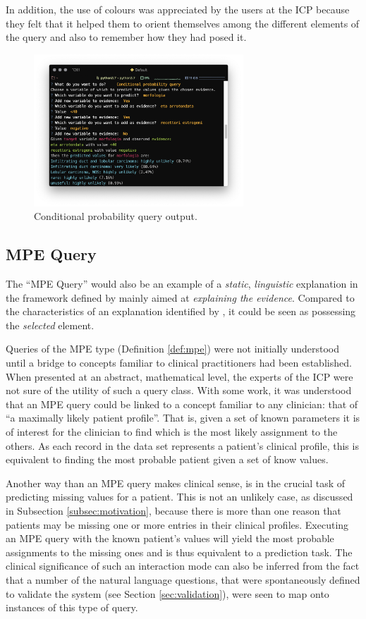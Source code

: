 In addition, the use of colours was appreciated by the users at the ICP because they felt that it helped them to orient themselves among the different elements of the query and also to remember how they had posed it.  

\begin{figure}[htbp]
\centerline{\includegraphics[width=0.7\textwidth]{results/images/sw_3_query}}
\caption{Conditional probability query output.}
\label{fig:sw_3_query}
\end{figure}

\subsection{MPE Query}
The \enquote{MPE Query} would also be an example of a \textit{static}, \textit{linguistic} explanation in the framework defined by \citet{lacave2002review} mainly aimed at \textit{explaining the evidence}.
Compared to the characteristics of an explanation identified by \citet{miller2018explanation}, it could be seen as possessing the \textit{selected} element.

Queries of the MPE type (Definition \ref{def:mpe}) were not initially understood until a bridge to concepts familiar to clinical practitioners had been established.
When presented at an abstract, mathematical level, the experts of the ICP were not sure of the utility of such a query class.
With some work, it was understood that an MPE query could be linked to a concept familiar to any clinician: that of \enquote{a maximally likely patient profile}.
That is, given a set of known parameters it is of interest for the clinician to find which is the most likely assignment to the others.
As each record in the data set represents a patient's clinical profile, this is equivalent to finding the most probable patient given a set of know values.

Another way than an MPE query makes clinical sense, is in the crucial task of predicting missing values for a patient.
This is not an unlikely case, as discussed in Subsection \ref{subsec:motivation}, because there is more than one reason that patients may be missing one or more entries in their clinical profiles.
Executing an MPE query with the known patient's values will yield the most probable assignments to the missing ones and is thus equivalent to a prediction task.
The clinical significance of such an interaction mode can also be inferred from the fact that a number of the natural language questions, that were spontaneously defined to validate the system (see Section \ref{sec:validation}), were seen to map onto instances of this type of query.

